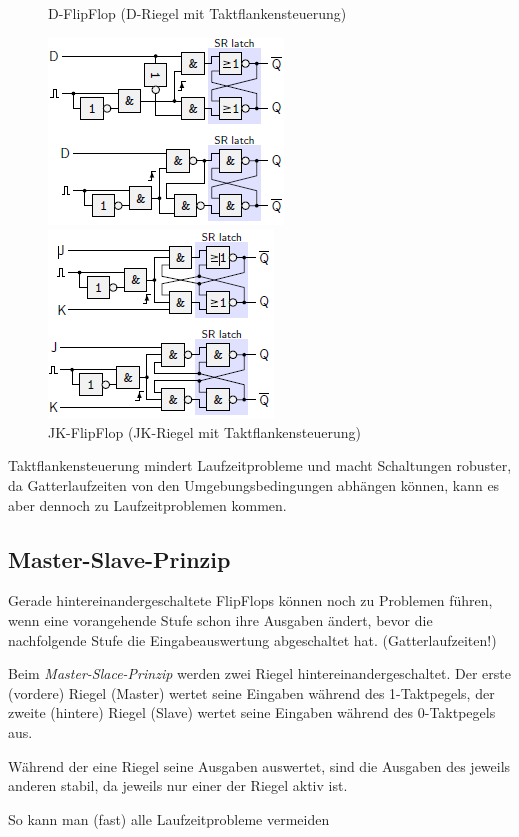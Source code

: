 \documentclass[12pt]{report}
\begin{document}
\begin{figure}[H]
  \begin{minipage}[t]{0.45\textwidth}
    \caption{D-FlipFlop (D-Riegel mit Taktflankensteuerung)}
    \centering
    \includegraphics{taktflankensteuerung_d-flipflop}
  \end{minipage}
  \hfill
  \begin{minipage}[t]{0.45\textwidth}
    \caption{JK-FlipFlop (JK-Riegel mit Taktflankensteuerung)}
    \centering
    \includegraphics{taktflankensteuerung_jk-flipflop}
  \end{minipage}
\end{figure}

\begin{infobox}
  Taktflankensteuerung mindert Laufzeitprobleme und macht Schaltungen robuster, da Gatterlaufzeiten von den Umgebungsbedingungen abhängen können,
  kann es aber dennoch zu Laufzeitproblemen kommen.
\end{infobox}

\subsection{Master-Slave-Prinzip}
Gerade hintereinandergeschaltete FlipFlops können noch zu Problemen führen,
wenn eine vorangehende Stufe schon ihre Ausgaben ändert,
bevor die nachfolgende Stufe die Eingabeauswertung abgeschaltet hat. (Gatterlaufzeiten!)

\begin{defbox}
  Beim \textit{Master-Slace-Prinzip} werden zwei Riegel hintereinandergeschaltet. 
  Der erste (vordere) Riegel (Master) wertet seine Eingaben während des 1-Taktpegels, 
  der zweite (hintere) Riegel (Slave) wertet seine Eingaben während des 0-Taktpegels aus.
  
  Während der eine Riegel seine Ausgaben auswertet, sind die Ausgaben des jeweils anderen stabil,
  da jeweils nur einer der Riegel aktiv ist.
  
  So kann man (fast) alle Laufzeitprobleme vermeiden
\end{defbox}
\end{document}
